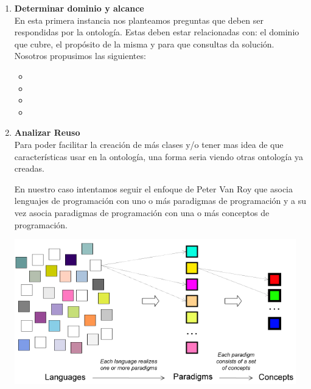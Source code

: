 \documentclass[12pt, titlepage, a4paper]{article}
\begin{document}
\begin{enumerate}
    \item {\textbf{Determinar dominio y alcance}\\
           En esta primera instancia nos planteamos preguntas que deben 
           ser respondidas por la ontología. Estas deben estar relacionadas 
           con: el dominio que cubre, el propósito de la misma y para que 
           consultas da solución. Nosotros propusimos las siguientes:
           \begin{itemize}
                \item {}
                \item {}
                \item {} 
                \item {}
           \end{itemize}}
    \newpage
    \item {\textbf{Analizar Reuso}\\
           Para poder facilitar la creación de más clases y/o tener mas 
           idea de que características usar en la ontología, una 
           forma seria viendo otras ontología ya creadas.

           En nuestro caso intentamos seguir el enfoque de Peter Van Roy\cite{vanroy} que
           asocia lenguajes de programación con uno o más paradigmas de programación
           y a su vez asocia paradigmas de programación con una o más conceptos de programación.\\

           \begin{center}
            \includegraphics[scale=0.75]{Imagenes/lenguajesParadigmasConceptos.png}
           \end{center}

}
\end{enumerate}
\end{document}
